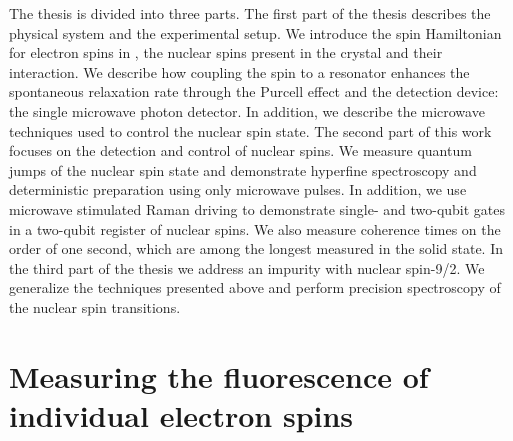 The thesis is divided into three parts. The first part of the thesis describes the physical system and the experimental setup. We introduce the spin Hamiltonian for \Er electron spins in \Ca, the nuclear spins present in the crystal and their interaction. We describe how coupling the \Er spin to a resonator enhances the spontaneous relaxation rate through the Purcell effect and the detection device: the single microwave photon detector. In addition, we describe the microwave techniques used to control the nuclear spin state. The second part of this work focuses on the detection and control of \W nuclear spins. We measure quantum jumps of the nuclear spin state and demonstrate hyperfine spectroscopy and deterministic preparation using only microwave pulses. In addition, we use microwave stimulated Raman driving to demonstrate single- and two-qubit gates in a two-qubit register of \W nuclear spins. We also measure coherence times on the order of one second, which are among the longest measured in the solid state. In the third part of the thesis we address an \Nb impurity with nuclear spin-9/2. We generalize the techniques presented above and perform precision spectroscopy of the nuclear spin transitions.

\section{Measuring the fluorescence of individual electron spins}

